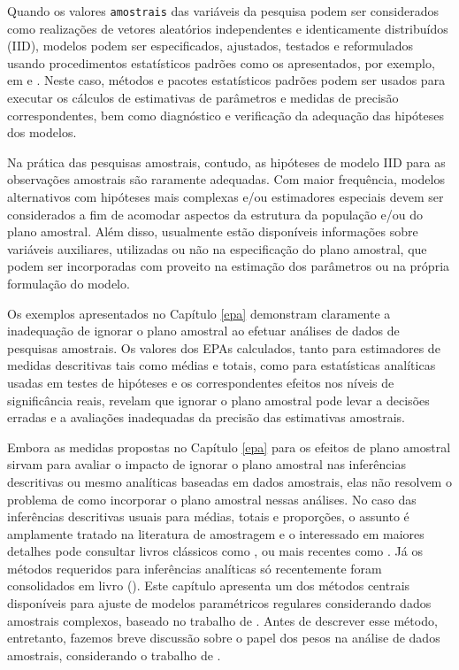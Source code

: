 \documentclass[]{book}
\numberwithin{example}{chapter}
\numberwithin{remark}{chapter}
\numberwithin{definition}{chapter}
\begin{document}
Quando os valores \texttt{amostrais} das variáveis da pesquisa podem ser
considerados como realizações de vetores aleatórios independentes e
identicamente distribuídos (IID), modelos podem ser especificados,
ajustados, testados e reformulados usando procedimentos estatísticos
padrões como os apresentados, por exemplo, em \citep{bickel} e
\citep{garthwaite}. Neste caso, métodos e pacotes estatísticos padrões
podem ser usados para executar os cálculos de estimativas de parâmetros
e medidas de precisão correspondentes, bem como diagnóstico e
verificação da adequação das hipóteses dos modelos.

Na prática das pesquisas amostrais, contudo, as hipóteses de modelo IID
para as observações amostrais são raramente adequadas. Com maior
frequência, modelos alternativos com hipóteses mais complexas e/ou
estimadores especiais devem ser considerados a fim de acomodar aspectos
da estrutura da população e/ou do plano amostral. Além disso, usualmente
estão disponíveis informações sobre variáveis auxiliares, utilizadas ou
não na especificação do plano amostral, que podem ser incorporadas com
proveito na estimação dos parâmetros ou na própria formulação do modelo.

Os exemplos apresentados no Capítulo \ref{epa} demonstram claramente a
inadequação de ignorar o plano amostral ao efetuar análises de dados de
pesquisas amostrais. Os valores dos EPAs calculados, tanto para
estimadores de medidas descritivas tais como médias e totais, como para
estatísticas analíticas usadas em testes de hipóteses e os
correspondentes efeitos nos níveis de significância reais, revelam que
ignorar o plano amostral pode levar a decisões erradas e a avaliações
inadequadas da precisão das estimativas amostrais.

Embora as medidas propostas no Capítulo \ref{epa} para os efeitos de
plano amostral sirvam para avaliar o impacto de ignorar o plano amostral
nas inferências descritivas ou mesmo analíticas baseadas em dados
amostrais, elas não resolvem o problema de como incorporar o plano
amostral nessas análises. No caso das inferências descritivas usuais
para médias, totais e proporções, o assunto é amplamente tratado na
literatura de amostragem e o interessado em maiores detalhes pode
consultar livros clássicos como \citep{cochran}, ou mais recentes como
\citep{SSW92}. Já os métodos requeridos para inferências analíticas só
recentemente foram consolidados em livro (\citep{SHS89}). Este capítulo
apresenta um dos métodos centrais disponíveis para ajuste de modelos
paramétricos regulares considerando dados amostrais complexos, baseado
no trabalho de \citep{binder87}. Antes de descrever esse método,
entretanto, fazemos breve discussão sobre o papel dos pesos na análise
de dados amostrais, considerando o trabalho de \citep{Pfeff}.
\end{document}
